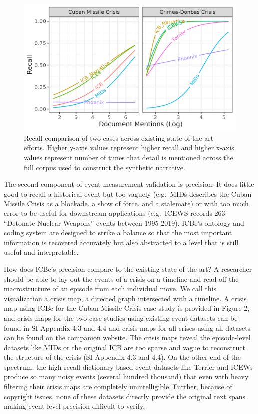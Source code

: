 \documentclass{article}
\begin{document}
\begin{figure}
\hypertarget{fig-recall-cases}{%
\centering
\includegraphics{p_recall.png}
\caption{Recall comparison of two cases across existing state of the art
efforts. Higher y-axis values represent higher recall and higher x-axis
values represent number of times that detail is mentioned across the
full corpus used to construct the synthetic
narrative.}\label{fig-recall-cases}
}
\end{figure}

The second component of event measurement validation is precision. It
does little good to recall a historical event but too vaguely (e.g.~MIDs
describes the Cuban Missile Crisis as a blockade, a show of force, and a
stalemate) or with too much error to be useful for downstream
applications (e.g.~ICEWS records 263 ``Detonate Nuclear Weapons'' events
between 1995-2019). ICBe's ontology and coding system are designed to
strike a balance so that the most important information is recovered
accurately but also abstracted to a level that is still useful and
interpretable.

How does ICBe's precision compare to the existing state of the art? A
researcher should be able to lay out the events of a crisis on a
timeline and read off the macrostructure of an episode from each
individual move. We call this visualization a crisis map, a directed
graph intersected with a timeline. A crisis map using ICBe for the Cuban
Missile Crisis case study is provided in Figure 2, and crisis maps for
the two case studies using existing event datasets can be found in SI
Appendix 4.3 and 4.4 and crisis maps for all crises using all datasets
can be found on the companion website. The crisis maps reveal the
episode-level datasets like MIDs or the original ICB are too sparse and
vague to reconstruct the structure of the crisis (SI Appendix 4.3 and
4.4). On the other end of the spectrum, the high recall dictionary-based
event datasets like Terrier and ICEWs produce so many noisy events
(several hundred thousand) that even with heavy filtering their crisis
maps are completely unintelligible. Further, because of copyright
issues, none of these datasets directly provide the original text spans
making event-level precision difficult to verify.
\end{document}
